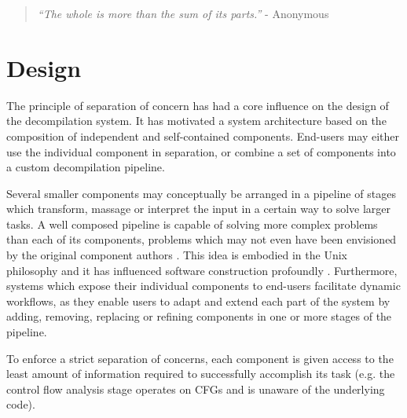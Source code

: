 
%


\begin{quote}
	\textit{``The whole is more than the sum of its parts.''} - Anonymous
\end{quote}

\section{Design}
\label{sec:design}

The principle of separation of concern has had a core influence on the design of the decompilation system. It has motivated a system architecture based on the composition of independent and self-contained components. End-users may either use the individual component in separation, or combine a set of components into a custom decompilation pipeline.

Several smaller components may conceptually be arranged in a pipeline of stages which transform, massage or interpret the input in a certain way to solve larger tasks. A well composed pipeline is capable of solving more complex problems than each of its components, problems which may not even have been envisioned by the original component authors \cite{simplicity_and_collaboration}. This idea is embodied in the Unix philosophy and it has influenced software construction profoundly \cite{art_of_unix}. Furthermore, systems which expose their individual components to end-users facilitate dynamic workflows, as they enable users to adapt and extend each part of the system by adding, removing, replacing or refining components in one or more stages of the pipeline.

To enforce a strict separation of concerns, each component is given access to the least amount of information required to successfully accomplish its task (e.g. the control flow analysis stage operates on CFGs and is unaware of the underlying code).

